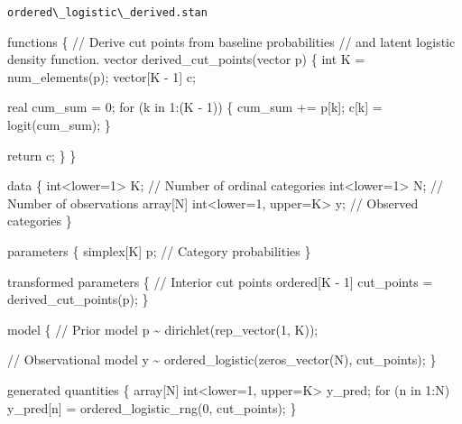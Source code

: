 \documentclass[
  letterpaper,
  DIV=11,
  numbers=noendperiod]{scrartcl}
\newenvironment{Shaded}{\begin{snugshade}}{\end{snugshade}}
\newcommand{\CommentTok}[1]{\textcolor[rgb]{0.37,0.37,0.37}{#1}}
\newcommand{\ControlFlowTok}[1]{\textcolor[rgb]{0.00,0.23,0.31}{#1}}
\newcommand{\DataTypeTok}[1]{\textcolor[rgb]{0.68,0.00,0.00}{#1}}
\newcommand{\DecValTok}[1]{\textcolor[rgb]{0.68,0.00,0.00}{#1}}
\newcommand{\KeywordTok}[1]{\textcolor[rgb]{0.00,0.23,0.31}{#1}}
\newcommand{\NormalTok}[1]{\textcolor[rgb]{0.00,0.23,0.31}{#1}}
\begin{document}
\begin{codelisting}

\caption{\texttt{ordered\textbackslash\_logistic\textbackslash\_derived.stan}}

\begin{Shaded}
\begin{Highlighting}[]
\KeywordTok{functions}\NormalTok{ \{}
  \CommentTok{// Derive cut points from baseline probabilities}
  \CommentTok{// and latent logistic density function.}
  \DataTypeTok{vector}\NormalTok{ derived\_cut\_points(}\DataTypeTok{vector}\NormalTok{ p) \{}
    \DataTypeTok{int}\NormalTok{ K = num\_elements(p);}
    \DataTypeTok{vector}\NormalTok{[K {-} }\DecValTok{1}\NormalTok{] c;}

    \DataTypeTok{real}\NormalTok{ cum\_sum = }\DecValTok{0}\NormalTok{;}
    \ControlFlowTok{for}\NormalTok{ (k }\ControlFlowTok{in} \DecValTok{1}\NormalTok{:(K {-} }\DecValTok{1}\NormalTok{)) \{}
\NormalTok{      cum\_sum += p[k];}
\NormalTok{      c[k] = logit(cum\_sum);}
\NormalTok{    \}}

    \ControlFlowTok{return}\NormalTok{ c;}
\NormalTok{  \}}
\NormalTok{\}}

\KeywordTok{data}\NormalTok{ \{}
  \DataTypeTok{int}\NormalTok{\textless{}}\KeywordTok{lower}\NormalTok{=}\DecValTok{1}\NormalTok{\textgreater{} K;                   }\CommentTok{// Number of ordinal categories}
  \DataTypeTok{int}\NormalTok{\textless{}}\KeywordTok{lower}\NormalTok{=}\DecValTok{1}\NormalTok{\textgreater{} N;                   }\CommentTok{// Number of observations}
  \DataTypeTok{array}\NormalTok{[N] }\DataTypeTok{int}\NormalTok{\textless{}}\KeywordTok{lower}\NormalTok{=}\DecValTok{1}\NormalTok{, }\KeywordTok{upper}\NormalTok{=K\textgreater{} y; }\CommentTok{// Observed categories}
\NormalTok{\}}

\KeywordTok{parameters}\NormalTok{ \{}
  \DataTypeTok{simplex}\NormalTok{[K] p; }\CommentTok{// Category probabilities}
\NormalTok{\}}

\KeywordTok{transformed parameters}\NormalTok{ \{}
  \CommentTok{// Interior cut points}
  \DataTypeTok{ordered}\NormalTok{[K {-} }\DecValTok{1}\NormalTok{] cut\_points = derived\_cut\_points(p);}
\NormalTok{\}}

\KeywordTok{model}\NormalTok{ \{}
  \CommentTok{// Prior model}
\NormalTok{  p \textasciitilde{} dirichlet(rep\_vector(}\DecValTok{1}\NormalTok{, K));}

  \CommentTok{// Observational model}
\NormalTok{  y \textasciitilde{} ordered\_logistic(zeros\_vector(N), cut\_points);}
\NormalTok{\}}

\KeywordTok{generated quantities}\NormalTok{ \{}
  \DataTypeTok{array}\NormalTok{[N] }\DataTypeTok{int}\NormalTok{\textless{}}\KeywordTok{lower}\NormalTok{=}\DecValTok{1}\NormalTok{, }\KeywordTok{upper}\NormalTok{=K\textgreater{} y\_pred;}
  \ControlFlowTok{for}\NormalTok{ (n }\ControlFlowTok{in} \DecValTok{1}\NormalTok{:N)}
\NormalTok{    y\_pred[n] = ordered\_logistic\_rng(}\DecValTok{0}\NormalTok{, cut\_points);}
\NormalTok{\}}
\end{Highlighting}
\end{Shaded}

\end{codelisting}
\end{document}
